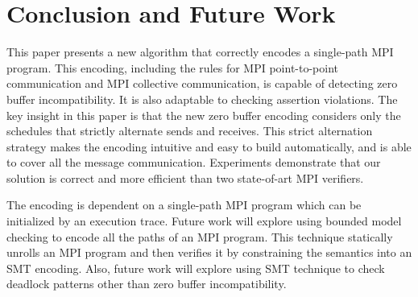 \section{Conclusion and Future Work}
This paper presents a new algorithm that correctly encodes a single-path MPI program. This encoding, including the rules for MPI point-to-point communication and MPI collective communication, is capable of detecting zero buffer incompatibility. It is also adaptable to checking assertion violations. The key insight in this paper is that the new zero buffer encoding considers only the schedules that strictly alternate sends and receives. This strict alternation strategy makes the encoding intuitive and easy to build automatically, and is able to cover all the message communication. Experiments demonstrate that our solution is correct and more efficient than two state-of-art MPI verifiers. 

The encoding is dependent on a single-path MPI program which can be initialized by an execution trace. Future work will explore using bounded model checking to encode all the paths of an MPI program. This technique statically unrolls an MPI program and then verifies it by constraining the semantics into an SMT encoding. Also, future work will explore using SMT technique to check deadlock patterns other than zero buffer incompatibility.  